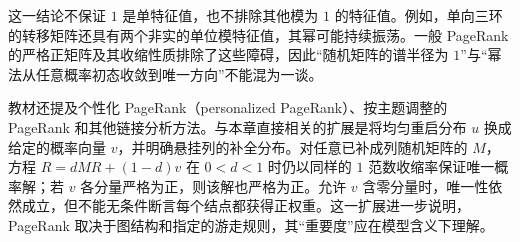 这一结论不保证 $1$ 是单特征值，也不排除其他模为 $1$ 的特征值。例如，单向三环的转移矩阵还具有两个非实的单位模特征值，其幂可能持续振荡。一般 PageRank 的严格正矩阵及其收缩性质排除了这些障碍，因此“随机矩阵的谱半径为 $1$”与“幂法从任意概率初态收敛到唯一方向”不能混为一谈。

教材还提及个性化 PageRank（personalized PageRank）、按主题调整的 PageRank 和其他链接分析方法。与本章直接相关的扩展是将均匀重启分布 $u$ 换成给定的概率向量 $v$，并明确悬挂列的补全分布。对任意已补成列随机矩阵的 $M$，方程 $R=dMR+(1-d)v$ 在 $0<d<1$ 时仍以同样的 $1$ 范数收缩率保证唯一概率解；若 $v$ 各分量严格为正，则该解也严格为正。允许 $v$ 含零分量时，唯一性依然成立，但不能无条件断言每个结点都获得正权重。这一扩展进一步说明，PageRank 取决于图结构和指定的游走规则，其“重要度”应在模型含义下理解。





